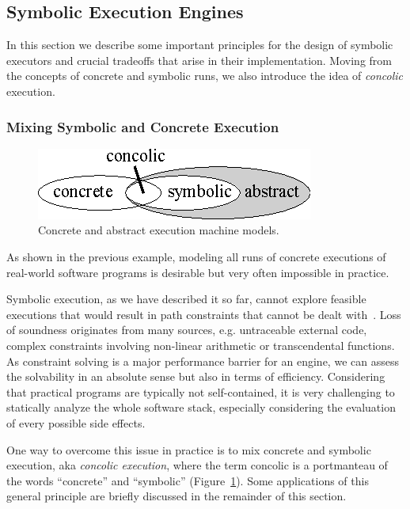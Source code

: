 \subsection{Symbolic Execution Engines}
\label{se:executors}

In this section we describe some important principles for the design of symbolic executors and crucial tradeoffs that arise in their implementation. Moving from the concepts of concrete and symbolic runs, we also introduce the idea of {\em concolic} execution.

\subsubsection{Mixing Symbolic and Concrete Execution}
\label{ss:concrete-concolic-symbolic}

\begin{figure}[t]
	\centering
	\includegraphics[width=0.32\columnwidth]{images/concrete-abstract.eps} 
	\caption{Concrete and abstract execution machine models.}
	\label{fig:concrete-symbolic}
	\vspace{-1.5mm}
\end{figure}

As shown in the previous example, modeling all runs of concrete executions of real-world software programs is desirable but very often impossible in practice.

Symbolic execution, as we have described it so far, cannot explore feasible executions that would result in path constraints that cannot be dealt with~\cite{CS-CACM13}. Loss of soundness originates from many sources, e.g. untraceable external code, complex constraints involving non-linear arithmetic or transcendental functions. As constraint solving is a major performance barrier for an engine, we can assess the solvability in an absolute sense but also in terms of efficiency. Considering that practical programs are typically not self-contained, it is very challenging to statically analyze the whole software stack, especially considering the evaluation of every possible side effects.

One way to overcome this issue in practice is to mix concrete and symbolic execution, aka {\em concolic execution}, where the term concolic is a portmanteau of the words ``concrete'' and ``symbolic'' (Figure~\ref{fig:concrete-symbolic}). Some applications of this general principle are briefly discussed in the remainder of this section.


